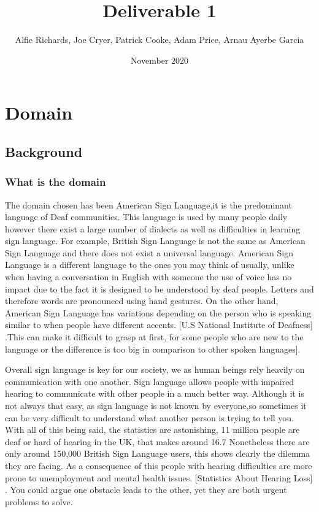 \documentclass[10pt]{article}
\title{Deliverable 1}
\author{Alfie Richards, Joe Cryer, Patrick Cooke, Adam Price, Arnau Ayerbe Garcia}
\begin{document}
\date{November 2020}
  \maketitle
  \tableofcontents

  \section{Domain}
  \subsection{Background}
  \subsubsection{What is the domain}
  The domain chosen has been American Sign Language,it is the predominant language of Deaf 
  communities. This language is used by many people daily however there exist a large number of 
  dialects as well as difficulties in learning sign language. For example, British Sign Language is 
  not the same as American Sign Language and there does not exist a universal language. American 
  Sign Language is a different language to the ones you may think of usually, unlike when having a 
  conversation in English with someone the use of voice has no impact due to the fact it is designed 
  to be understood by deaf people. Letters and therefore words are pronounced using hand gestures. 
  On the other hand, American Sign Language has variations depending on the person who is speaking 
  similar to when people have different accents. [U.S National Institute of Deafness] .This can make 
  it difficult to grasp at first, for some people who are new to the language or the difference is 
  too big in comparison to other spoken languages]. 

  Overall sign language is key for our society, we as human beings rely heavily on communication 
  with one another. Sign language allows people with impaired hearing to communicate with other 
  people in a much better way. Although it is not always that easy, as sign language is not known by 
  everyone,so sometimes it can be very difficult to understand what another person is trying to tell 
  you. With all of this being said, the statistics are astonishing, 11 million people are deaf or 
  hard of hearing in the UK, that makes around 16.7%
  Nonetheless there are only around 150,000 British Sign Language users, this shows clearly the 
  dilemma they are facing. As a consequence of this people with hearing difficulties are more prone 
  to unemployment and mental health issues. [Statistics About Hearing Loss] . You could argue one 
  obstacle leads to the other, yet they are both urgent problems to solve.
\end{document}
